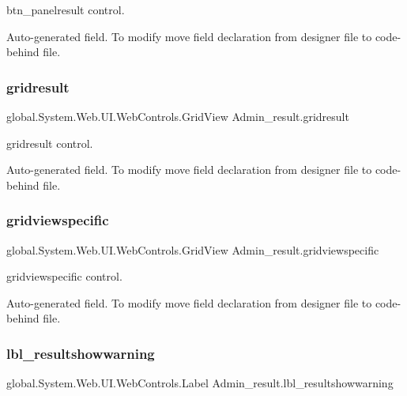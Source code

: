 btn\+\_\+panelresult control. 

Auto-\/generated field. To modify move field declaration from designer file to code-\/behind file. \mbox{\label{class_admin__result_ac8582906385bb5c91b199218a6ba0138}} 
\subsubsection{\texorpdfstring{gridresult}{gridresult}}
{\footnotesize\ttfamily global.\+System.\+Web.\+U\+I.\+Web\+Controls.\+Grid\+View Admin\+\_\+result.\+gridresult\hspace{0.3cm}{\ttfamily [protected]}}



gridresult control. 

Auto-\/generated field. To modify move field declaration from designer file to code-\/behind file. \mbox{\label{class_admin__result_a9fd3719ab16b4d12e8e607cf2e0bac5b}} 
\subsubsection{\texorpdfstring{gridviewspecific}{gridviewspecific}}
{\footnotesize\ttfamily global.\+System.\+Web.\+U\+I.\+Web\+Controls.\+Grid\+View Admin\+\_\+result.\+gridviewspecific\hspace{0.3cm}{\ttfamily [protected]}}



gridviewspecific control. 

Auto-\/generated field. To modify move field declaration from designer file to code-\/behind file. \mbox{\label{class_admin__result_a02e38862159463673c5de3b4952a97f9}} 
\subsubsection{\texorpdfstring{lbl\_resultshowwarning}{lbl\_resultshowwarning}}
{\footnotesize\ttfamily global.\+System.\+Web.\+U\+I.\+Web\+Controls.\+Label Admin\+\_\+result.\+lbl\+\_\+resultshowwarning\hspace{0.3cm}{\ttfamily [protected]}}



